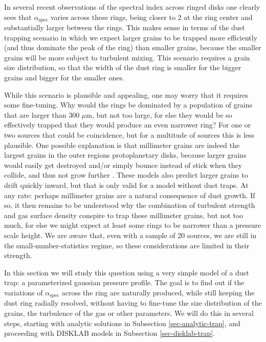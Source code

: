 \documentclass{aa}
\begin{document}
In several recent observations of the spectral index across ringed disks
\citep{2015ApJ...808L...3A,2018ApJ...852..122H} one clearly sees that
$\alpha_{\mathrm{spec}}$ varies across these rings, being closer to $2$ at the
ring center and substantially larger between the rings. This makes sense in
terms of the dust trapping scenario in which we expect larger grains to be
trapped more efficiently (and thus dominate the peak of the ring) than smaller
grains, because the smaller grains will be more subject to turbulent
mixing. This scenario requires a grain size distribution, so that the width of
the dust ring is smaller for the bigger grains and bigger for the smaller ones.

While this scenario is plausible and appealing, one may worry that it requires
some fine-tuning. Why would the rings be dominated by a population of grains
that are larger than 300 $\mu$m, but not too large, for else they would be so
effectively trapped that they would produce an even narrower ring? For one or
two sources that could be coincidence, but for a multitude of sources this is
less plausible. One possible explanation is that millimeter grains are indeed
the largest grains in the outer regions protoplanetary disks, because larger
grains would easily get destroyed and/or simply bounce instead of stick when
they collide, and thus not grow further \citep{2010A&A...513A..56G,
  2010A&A...513A..57Z}. These models also predict larger grains to drift quickly
inward, but that is only valid for a model without dust traps. At any rate:
perhaps millimeter grains are a natural consequence of dust growth. If so, it
then remains to be understood why the combination of turbulent strength and gas
surface density conspire to trap these millimeter grains, but not too much, for
else we might expect at least some rings to be narrower than a pressure scale
height. We are aware that, even with a sample of 20 sources, we are still in the
small-number-statistics regime, so these considerations are limited in their
strength.

In this section we will study this question using a very simple model of a dust
trap: a parameterized gaussian pressure profile. The goal is to find out if the
variations of $\alpha_{\mathrm{spec}}$ across the ring are naturally produced,
while still keeping the dust ring radially resolved, without having to fine-tune
the size distribution of the grains, the turbulence of the gas or other
parameters. We will do this in several steps, starting with analytic solutions
in Subsection \ref{sec-analytic-trap}, and proceeding with DISKLAB models in
Subsection \ref{sec-disklab-trap}.
\end{document}
